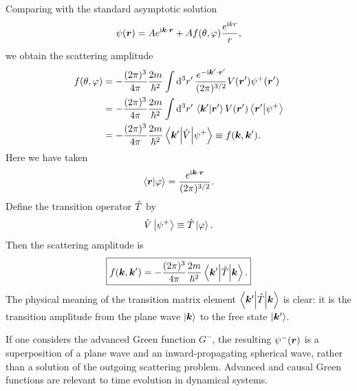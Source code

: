 \begin{center}
\end{center}
Comparing with the standard asymptotic solution
\begin{equation}
\psi(\bm{r})=Ae^{\mathrm{i}\bm{k}\cdot\bm{r}}+Af(\theta,\varphi)\frac{e^{\mathrm{i} kr}}r,
\end{equation}
we obtain the scattering amplitude
\begin{equation}\begin{aligned}
f(\theta,\varphi)
&=-\frac{(2\pi)^3}{4\pi}\frac{2m}{\hbar^2}
\int\mathrm{d}^3r'\,\frac{e^{-\mathrm{i}\bm{k}'\cdot\bm{r}'}}{(2\pi)^{3/2}}
V(\bm{r}')\psi^+(\bm{r}')\\
&=-\frac{(2\pi)^3}{4\pi}\frac{2m}{\hbar^2}
\int\mathrm{d}^3r'\,\left\langle\bm{k}'\middle|\bm{r}'\right\rangle V(\bm{r}')
\left\langle\bm{r}'\middle|\psi^+\right\rangle\\
&=-\frac{(2\pi)^3}{4\pi}\frac{2m}{\hbar^2}
\left\langle\bm{k}'\middle|\hat{V}\middle|\psi^+\right\rangle
\equiv f(\bm{k},\bm{k}').
\end{aligned}\end{equation}
Here we have taken
\begin{equation}
\left\langle\bm{r}\middle|\varphi\right\rangle=\frac{e^{\mathrm{i}\bm{k}\cdot\bm{r}}}{(2\pi)^{3/2}}.
\end{equation}
Define the transition operator $\hat{T}$ by
\begin{equation}
\hat{V}\left|\psi^+\right\rangle\equiv\hat{T}\left|\varphi\right\rangle.
\end{equation}
Then the scattering amplitude is
\begin{equation}
\boxed{f(\bm{k},\bm{k}')=-\frac{(2\pi)^3}{4\pi}\frac{2m}{\hbar^2}
\left\langle\bm{k}'\middle|\hat{T}\middle|\bm{k}\right\rangle.}
\end{equation}
The physical meaning of the transition matrix element $\left\langle\bm{k}'\middle|\hat{T}\middle|\bm{k}\right\rangle$ is clear: it is the transition amplitude from the plane wave $\left|\bm{k}\right\rangle$ to the free state $\left|\bm{k}'\right\rangle$.

If one considers the advanced Green function $G^-$, the resulting $\psi^-(\bm{r})$ is a superposition of a plane wave and an inward-propagating spherical wave, rather than a solution of the outgoing scattering problem. Advanced and causal Green functions are relevant to time evolution in dynamical systems.

